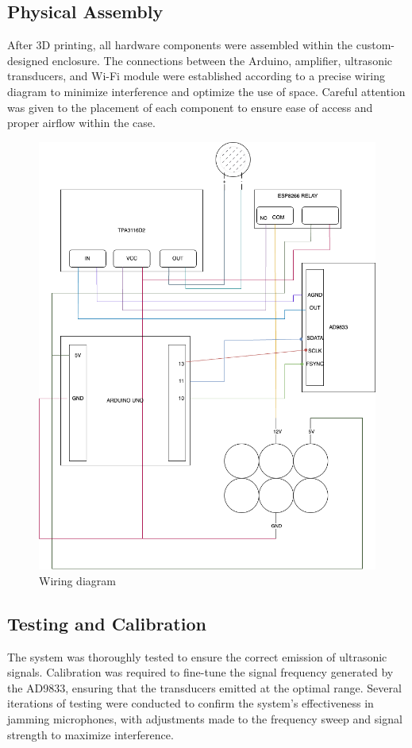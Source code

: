 \subsection{Physical Assembly} After 3D printing, all hardware components were assembled within the custom-designed enclosure. The connections between the Arduino, amplifier, ultrasonic transducers, and Wi-Fi module were established according to a precise wiring diagram to minimize interference and optimize the use of space. Careful attention was given to the placement of each component to ensure ease of access and proper airflow within the case.
\begin{figure}
    \centering
    \includegraphics[width=\linewidth]{images/diagram.drawio.png}
    \caption{Wiring diagram}
\end{figure}
\subsection{Testing and Calibration} The system was thoroughly tested to ensure the correct emission of ultrasonic signals. Calibration was required to fine-tune the signal frequency generated by the AD9833, ensuring that the transducers emitted at the optimal range. Several iterations of testing were conducted to confirm the system's effectiveness in jamming microphones, with adjustments made to the frequency sweep and signal strength to maximize interference.